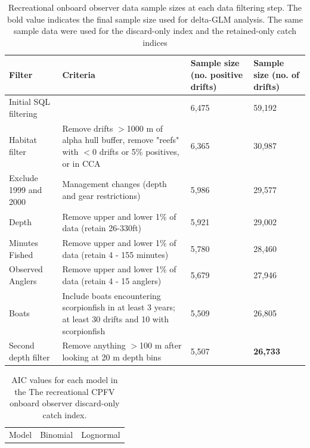 \documentclass[12pt,]{article}
\begin{document}
\begin{table}[ht]
\centering
\caption{Recreational onboard observer data sample 
                                          sizes at each data filtering step.  
                                          The bold value indicates the final sample size 
                                          used for delta-GLM analysis.
                                          The same sample data were used for the discard-only
                                          index and the retained-only catch indices} 
\label{tab:Fleet6_RecDD_onboard_filter}
\begin{tabular}{>{\raggedright}p{1.5in}>{\raggedright}p{2.6in}>{\raggedright}p{1in}>{\raggedright}p{1in}}
  \hline
Filter & Criteria & Sample size (no. positive drifts) & Sample size (no. of drifts) \\ 
  \hline
Initial SQL filtering &  & 6,475 & 59,192 \\ 
  Habitat filter & Remove drifts $>$1000 m of alpha hull buffer, remove "reefs" with $<$0 drifts or 5\% positives, or in CCA & 6,365 & 30,987 \\ 
  Exclude 1999 and 2000 & Management changes (depth and gear restrictions) & 5,986 & 29,577 \\ 
  Depth & Remove upper and lower 1\% of data (retain 26-330ft) & 5,921 & 29,002 \\ 
  Minutes Fished & Remove upper and lower 1\% of data (retain 4 - 155 minutes) & 5,780 & 28,460 \\ 
  Observed Anglers & Remove upper and lower 1\% of data (retain 4 - 15 anglers) & 5,679 & 27,946 \\ 
  Boats  & Include boats encountering scorpionfish in at least 3 years; at least 30 drifts and 10 with scorpionfish & 5,509 & 26,805 \\ 
  Second depth filter & Remove anything $>$100 m after looking at 20 m depth bins & 5,507 & \textbf{26,733} \\ 
   \hline
\end{tabular}
\end{table}\begin{table}[ht]
\centering
\caption{AIC values for each model in the
                                          The recreational CPFV onboard 
                                          observer discard-only catch 
                                          index.} 
\label{tab:Fleet6_RecDD_onboard_aic}
\begin{tabular}{lll}
  \hline
Model & Binomial & Lognormal \\ 

\end{tabular}
\end{table}
\end{document}
